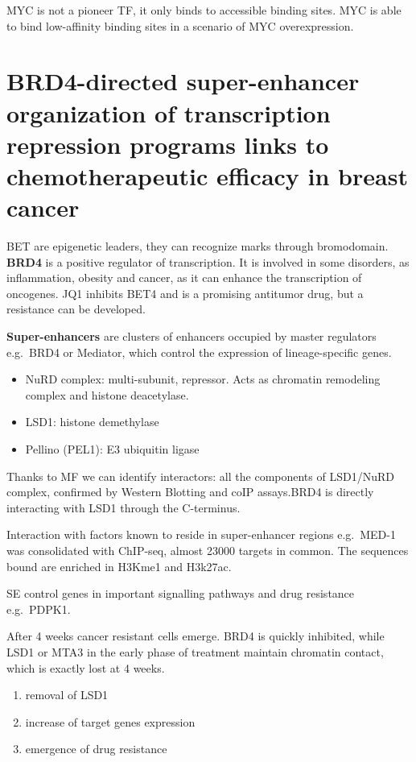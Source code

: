 MYC is not a pioneer TF, it only binds to accessible binding sites. MYC is able to bind low-affinity binding sites in a scenario of MYC overexpression.


\section{BRD4-directed super-enhancer organization of transcription repression programs links to chemotherapeutic efficacy in breast cancer}

BET are epigenetic leaders, they can recognize marks through
bromodomain. \textbf{BRD4} is a positive regulator of transcription. It
is involved in some disorders, as inflammation, obesity and cancer, as
it can enhance the transcription of oncogenes. JQ1 inhibits BET4 and is
a promising antitumor drug, but a resistance can be developed.

\textbf{Super-enhancers} are clusters of enhancers occupied by master
regulators e.g.~BRD4 or Mediator, which control the expression of
lineage-specific genes.

\begin{itemize}
\tightlist
\item
  NuRD complex: multi-subunit, repressor. Acts as chromatin remodeling
  complex and histone deacetylase.
\item
  LSD1: histone demethylase
\item
  Pellino (PEL1): E3 ubiquitin ligase
\end{itemize}

Thanks to MF we can identify interactors: all the components of LSD1/NuRD complex, confirmed
by Western Blotting and coIP assays.BRD4 is directly interacting with LSD1 through the C-terminus.


Interaction with factors known to reside in super-enhancer regions
e.g.~MED-1 was consolidated with ChIP-seq, almost 23000 targets in common.
The sequences bound are enriched in H3Kme1 and H3k27ac.

SE control genes in important signalling pathways and drug resistance e.g.~PDPK1.

After 4 weeks cancer resistant cells emerge. BRD4 is quickly inhibited,
while LSD1 or MTA3 in the early phase of treatment maintain chromatin
contact, which is exactly lost at 4 weeks.

\begin{enumerate}
\tightlist
\item
  removal of LSD1
\item
  increase of target genes expression
\item
  emergence of drug resistance
\end{enumerate}


